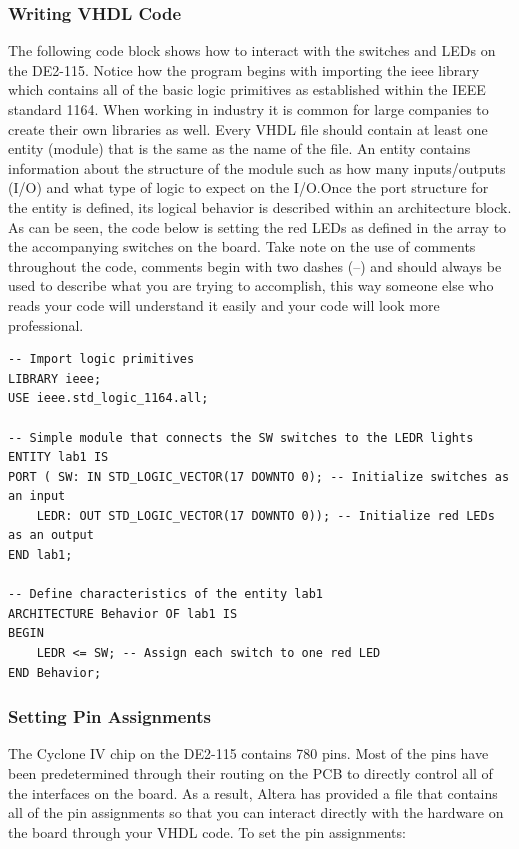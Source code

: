 \subsubsection{Writing VHDL Code}

The following code block shows how to interact with the switches and LEDs on the DE2-115. Notice how the program begins with importing the ieee library which contains all of the basic logic primitives as established within the IEEE standard 1164. When working in industry it is common for large companies to create their own libraries as well. Every VHDL file should contain at least one entity (module) that is the same as the name of the file. An entity contains information about the structure of the module such as how many inputs/outputs (I/O) and what type of logic to expect on the I/O.Once the port structure for the entity is defined, its logical behavior is described within an architecture block. As can be seen, the code below is setting the red LEDs as defined in the array to the accompanying switches on the board. Take note on the use of comments throughout the code, comments begin with two dashes (--) and should always be used to describe what you are trying to accomplish, this way someone else who reads your code will understand it easily and your code will look more professional. 

\begin{lstlisting}
-- Import logic primitives
LIBRARY ieee;
USE ieee.std_logic_1164.all;

-- Simple module that connects the SW switches to the LEDR lights
ENTITY lab1 IS
PORT ( SW: IN STD_LOGIC_VECTOR(17 DOWNTO 0); -- Initialize switches as an input
	LEDR: OUT STD_LOGIC_VECTOR(17 DOWNTO 0)); -- Initialize red LEDs as an output
END lab1;

-- Define characteristics of the entity lab1
ARCHITECTURE Behavior OF lab1 IS
BEGIN
	LEDR <= SW; -- Assign each switch to one red LED
END Behavior;
\end{lstlisting}

\subsubsection{Setting Pin Assignments}
The Cyclone IV chip on the DE2-115 contains 780 pins. Most of the pins  have been predetermined through their routing on the PCB to directly control all of the interfaces on the board. As a result, Altera has provided a file that contains all of the pin assignments so that you can interact directly with the hardware on the board through your VHDL code. To set the pin assignments:

